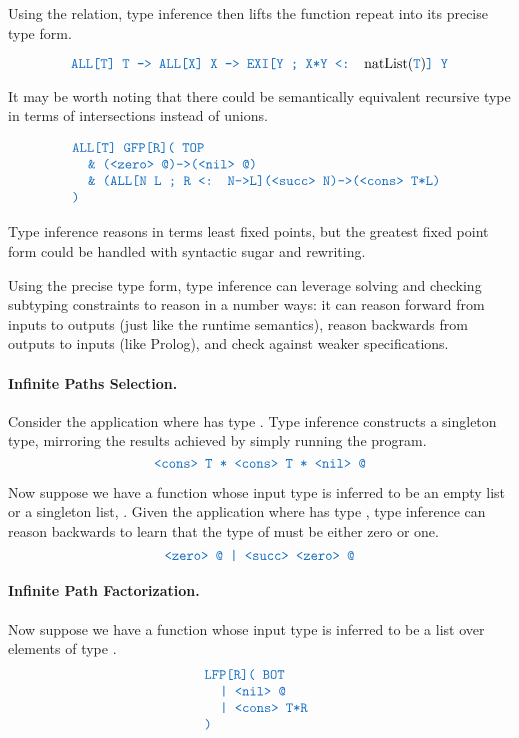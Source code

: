 \documentclass[acmsmall]{acmart}
\theoremstyle{definition}
\begin{document}
Using the  relation, type inference then lifts the function repeat into its precise type form.

\[
  \J{ALL[T] T -> ALL[X] X -> EXI[Y ; X*Y <: }\text{natList}(\J{T}) \J{] Y}
\]

It may be worth noting that there could be semantically equivalent recursive type in terms of intersections instead of unions. 


\[
  \begin{array}[t]{@{} l}
      \J{ALL[T] GFP[R]( TOP} 
      \\
      \I \J{\& (<zero> @)->(<nil> @)}
      \\
      \I \J{\& (ALL[N L ; R <: N->L](<succ> N)->(<cons> T*L)}
      \\
      \J{)} 
  \end{array}
\]


Type inference reasons in terms least fixed points, but the greatest fixed point form could
be handled with syntactic sugar and rewriting.  

Using the precise type form, type inference can leverage solving and checking subtyping constraints 
to reason in a number ways: it can reason forward from inputs to outputs (just like the runtime semantics), 
reason backwards from outputs to inputs (like Prolog), and check against weaker specifications. 


\paragraph{Infinite Paths Selection.} Consider the application  where 
has type . Type inference
constructs a singleton type, mirroring the results achieved by simply running the program.  
\[
  \J{<cons> T * <cons> T * <nil> @}
\]

Now suppose we have a function  whose input
type is inferred to be an empty list or a singleton list, .
Given the application  where  has type , type inference can reason backwards to learn
that the type of  must be either zero or one. 
\[
  \J{<zero> @ | <succ> <zero> @}
\]



\paragraph{Infinite Path Factorization.} 
Now suppose we have a function  whose input
type is inferred to be a list over elements of type .
\[
  \begin{array}[t]{@{} l}
      \J{LFP[R]( BOT}
      \\
      \I \J{| <nil> @ }
      \\
      \I \J{| <cons> T*R}
      \\
      \J{)}
  \end{array}
\]
\end{document}
